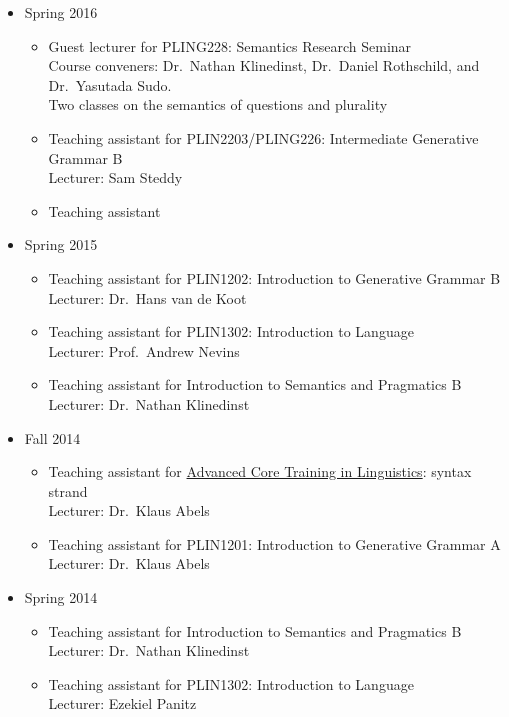 \documentclass[]{article}
\providecommand{\tightlist}{%
  \setlength{\itemsep}{0pt}\setlength{\parskip}{0pt}}
\begin{document}
\begin{itemize}
\tightlist
\item
  Spring 2016

  \begin{itemize}
  \tightlist
  \item
    Guest lecturer for PLING228: Semantics Research Seminar\\
    Course conveners: Dr.~Nathan Klinedinst, Dr.~Daniel Rothschild, and
    Dr.~Yasutada Sudo.\\
    Two classes on the semantics of questions and plurality
  \item
    Teaching assistant for PLIN2203/PLING226: Intermediate Generative
    Grammar B\\
    Lecturer: Sam Steddy
  \item
    Teaching assistant
  \end{itemize}
\end{itemize}

\begin{itemize}
\tightlist
\item
  Spring 2015

  \begin{itemize}
  \tightlist
  \item
    Teaching assistant for PLIN1202: Introduction to Generative Grammar
    B\\
    Lecturer: Dr.~Hans van de Koot
  \item
    Teaching assistant for PLIN1302: Introduction to Language\\
    Lecturer: Prof.~Andrew Nevins
  \item
    Teaching assistant for Introduction to Semantics and Pragmatics B\\
    Lecturer: Dr.~Nathan Klinedinst
  \end{itemize}
\item
  Fall 2014

  \begin{itemize}
  \tightlist
  \item
    Teaching assistant for \href{http://www.actl.ucl.ac.uk/}{Advanced
    Core Training in Linguistics}: syntax strand\\
    Lecturer: Dr.~Klaus Abels
  \item
    Teaching assistant for PLIN1201: Introduction to Generative Grammar
    A\\
    Lecturer: Dr.~Klaus Abels
  \end{itemize}
\item
  Spring 2014

  \begin{itemize}
  \tightlist
  \item
    Teaching assistant for Introduction to Semantics and Pragmatics B\\
    Lecturer: Dr.~Nathan Klinedinst
  \item
    Teaching assistant for PLIN1302: Introduction to Language\\
    Lecturer: Ezekiel Panitz
  \end{itemize}
\end{itemize}
\end{document}
